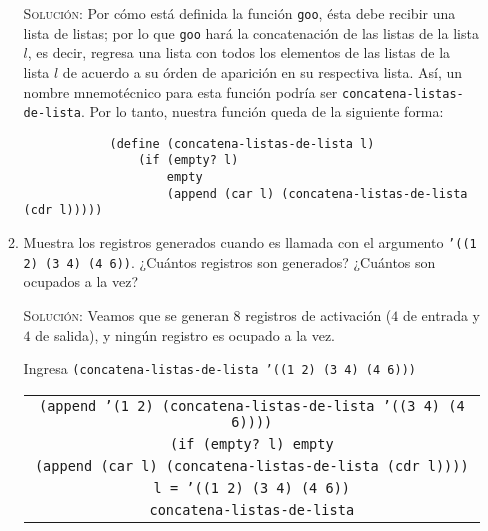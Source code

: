 \documentclass[letterpaper,11pt]{article}
\begin{document}
\begin{enumerate}
\begin{enumerate}
        \textsc{Solución:} Por cómo está definida la función \texttt{goo}, 
        ésta debe recibir una lista de listas; por lo que \texttt{goo} hará 
        la concatenación de las listas de la lista $l$, es decir, regresa una 
        lista con todos los elementos de las listas de la lista $l$ de acuerdo 
        a su órden de aparición en su respectiva lista. Así, un nombre 
        mnemotécnico para esta función podría ser 
        \texttt{concatena-listas-de-lista}. Por lo tanto, nuestra función 
        queda de la siguiente forma:
        \begin{verbatim}
            (define (concatena-listas-de-lista l)
                (if (empty? l)
                    empty
                    (append (car l) (concatena-listas-de-lista (cdr l)))))
        \end{verbatim}

        \newpage
        \item Muestra los registros generados cuando es llamada con el argumento
        \texttt{'((1 2) (3 4) (4 6))}. ¿Cuántos registros son generados? ¿Cuántos 
        son ocupados a la vez?

        \textsc{Solución:} Veamos que se generan $8$ registros de activación
        ($4$ de entrada y $4$ de salida), y ningún registro es ocupado a la vez.

        Ingresa \texttt{(concatena-listas-de-lista '((1 2) (3 4) (4 6)))}
        \begin{center}
            \begin{tabular}{|c|}
                \hline
                \texttt{(append '(1 2) 
                (concatena-listas-de-lista '((3 4) (4 6))))}  \\
                \texttt{(if (empty? l) empty} \\
                \texttt{(append (car l) (concatena-listas-de-lista (cdr l))))} \\
                \texttt{l = '((1 2) (3 4) (4 6))} \\
                \texttt{concatena-listas-de-lista} \\
                \hline
            \end{tabular}
        \end{center}


\end{enumerate}
\end{enumerate}
\end{document}
